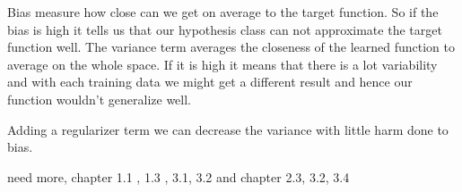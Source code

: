 Bias measure how close can we get on average to the target function. So if the bias is high it tells us that our hypothesis class can not approximate the target function well. The variance term averages the closeness of the learned function to average on the whole space. If it is high it means that there is a lot variability and with each training data we might get a different result and hence our function wouldn't generalize well.

Adding a regularizer term we can decrease the variance with little harm done to bias. 

need more, chapter 1.1 , 1.3 , 3.1, 3.2 and chapter 2.3, 3.2, 3.4